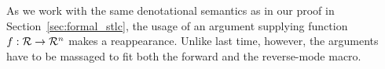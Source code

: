   As we work with the same denotational semantics as in our proof in Section~\ref{sec:formal_stlc}, the usage of an argument supplying function $f : \mathcal{R} \rightarrow \mathcal{R}^n$ makes a reappearance.
  Unlike last time, however, the arguments have to be massaged to fit both the forward and the reverse-mode macro.
